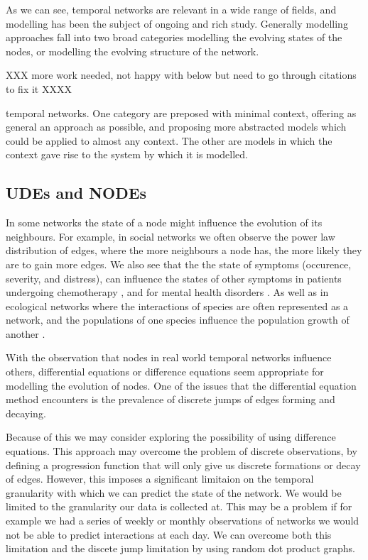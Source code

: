 \documentclass[12pt]{amsart}
\begin{document}
    As we can see, temporal networks are relevant in a wide range of fields, and modelling has been the subject of ongoing and rich study. Generally modelling approaches fall into two broad categories modelling the evolving states of the nodes, or modelling the evolving structure of the network. 

    XXX more work needed, not happy with below but need to go through citations to fix it XXXX

    temporal networks. One category are preposed with minimal context, offering as general an approach as possible\cite{HOLME201297,KARIMI20133476}, and proposing more abstracted models which could be applied to almost any context. The other are models in which the context gave rise to the system by which it is modelled\cite{zhangSpatioTempFlow2020,jordan2020current,moinetEffectOfRisk2018,caballero2017real}.


\subsection{UDEs and NODEs}
    In some networks the state of a node might influence the evolution of its neighbours. For example, in social networks we often observe the power law distribution of edges, where the more neighbours a node has, the more likely they are to gain more edges\cite{zhao2012multi,garg2009evolution}. We also see that the the state of symptoms (occurence, severity, and distress), can influence the states of other symptoms in patients undergoing chemotherapy \cite{papachristou2019network,kalantari2022network}, and for mental health disorders \cite{contreras2020temporal}. As well as in ecological networks where the interactions of species are often represented as a network, and the populations of one species influence the population growth of another \cite{elton2001animal,volterra1927variazioni}.
            
    With the observation that nodes in real world temporal networks influence others, differential equations or difference equations seem appropriate for modelling the evolution of nodes. One of the issues that the differential equation method encounters is the prevalence of discrete jumps of edges forming and decaying. 

    Because of this we may consider exploring the possibility of using difference equations. This approach may overcome the problem of discrete observations, by defining a progression function that will only give us discrete formations or decay of edges\cite{hanneke2010discrete}. However, this imposes a significant limitaion on the temporal granularity with which we can predict the state of the network. We would be limited to the granularity our data is collected at. This may be a problem if for example we had a series of weekly or monthly observations  of networks we would not be able to predict interactions at each day. We can overcome both this limitation and the discete jump limitation by using random dot product graphs.
    
\end{document}
